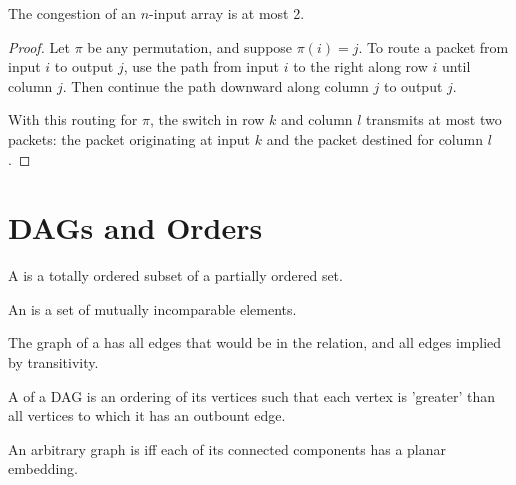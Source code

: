 \documentclass[handout]{mcs}
\begin{document}
\begin{theorem*} 
The congestion of an $n$-input array is at most 2. 
\end{theorem*} 
 
\begin{proof} 
  Let $\pi$ be any permutation, and suppose $\pi(i)=j$.  To route a packet 
  from input $i$ to output $j$, use the path from input $i$ to the right 
  along row $i$ until column $j$.  Then continue the path downward along 
  column $j$ to output $j$. 
 
  With this routing for $\pi$, the switch in row $k$ and column $l$ 
  transmits at most two packets: the packet originating at input $k$ and 
  the packet destined for column $l$. 
\end{proof} 

\section{DAGs and Orders}

A  is a totally ordered subset of a partially ordered set.

An  is a set of mutually incomparable elements.

The graph of a  has all edges that would
      be in the relation, and all edges implied by transitivity.

A  of a DAG is an ordering of its vertices
      such that each vertex is 'greater' than all vertices to which it has
      an outbount edge.
\fi

An arbitrary graph is  iff each of its connected
components has a planar embedding.
\end{document}
